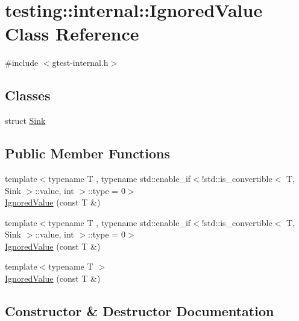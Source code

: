 \hypertarget{classtesting_1_1internal_1_1_ignored_value}{}\section{testing\+::internal\+::Ignored\+Value Class Reference}
\label{classtesting_1_1internal_1_1_ignored_value}


{\ttfamily \#include $<$gtest-\/internal.\+h$>$}

\subsection*{Classes}
\begin{DoxyCompactItemize}
\item 
struct \mbox{\hyperlink{structtesting_1_1internal_1_1_ignored_value_1_1_sink}{Sink}}
\end{DoxyCompactItemize}
\subsection*{Public Member Functions}
\begin{DoxyCompactItemize}
\item 
{\footnotesize template$<$typename T , typename std\+::enable\+\_\+if$<$!std\+::is\+\_\+convertible$<$ T, Sink $>$\+::value, int $>$\+::type  = 0$>$ }\\\mbox{\hyperlink{classtesting_1_1internal_1_1_ignored_value_a851d14f6c0f584d5c5a49ddbc06d6538}{Ignored\+Value}} (const T \&)
\item 
{\footnotesize template$<$typename T , typename std\+::enable\+\_\+if$<$!std\+::is\+\_\+convertible$<$ T, Sink $>$\+::value, int $>$\+::type  = 0$>$ }\\\mbox{\hyperlink{classtesting_1_1internal_1_1_ignored_value_a851d14f6c0f584d5c5a49ddbc06d6538}{Ignored\+Value}} (const T \&)
\item 
{\footnotesize template$<$typename T $>$ }\\\mbox{\hyperlink{classtesting_1_1internal_1_1_ignored_value_a6c72839c07a9da8d027efb253144bd91}{Ignored\+Value}} (const T \&)
\end{DoxyCompactItemize}


\subsection{Constructor \& Destructor Documentation}
\mbox{\label{classtesting_1_1internal_1_1_ignored_value_a851d14f6c0f584d5c5a49ddbc06d6538}} 
